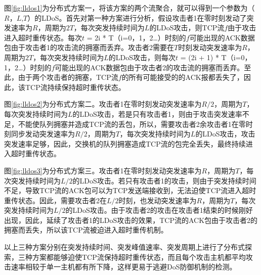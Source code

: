 图\ref{fig:lldos1}为分布式方案一，将该方案的两个流聚合，就可以得到一个参数为（$R$，$L$,$T$）的LDoS。首先对第一种方案进行分析，假设攻击者1在零时刻发动了突发速率为$R$，周期为$2T$，每次突发持续时间为$L$的LDoS攻击，则TCP流$f$由于攻击进入超时重传状态。每次$t$ = 2i * T（i=0，1，2…）时刻的$f$可能出现的ACK数据包由于攻击者1的攻击流的拥塞而丢弃。攻击者2需要在$T$时刻发动突发速率为$R$，周期为$2T$，每次突发持续时间为$L$的LDoS攻击，则每次$t$ = (2i + 1) * T（i=0，1，2…）时刻的$f$可能出现的ACK数据包由于攻击者2的攻击流的拥塞而丢弃。至此，由于两个攻击者的拥塞，TCP流$f$的所有可能接受的的ACK报都丢失了，因此，该TCP流持续保持超时重传状态。


图\ref{fig:lldos2}为分布式方案二。攻击者1在零时刻发动突发速率为$R/2$，周期为$T$，每次突发持续时间为$L$的LDoS攻击，若是只有攻击者1，则由于攻击突发速率不足，不能使队列拥塞并造成TCP流的丢包，所以，需要攻击者2余攻击者1在零时刻同步发动突发速率为$R/2$，周期为$T$，每次突发持续时间为$L$的LDoS攻击，攻击突发速率足够，因此，交换机的队列拥塞造成TCP流的包完全丢失，最终持续进入超时重传状态。


图\ref{fig:lldos3}为分布式方案三。攻击者1在零时刻发动突发速率为$R$，周期为$T$，每次突发持续时间为$L/2$的LDoS攻击。若只有攻击者1的攻击，则由于突发持续时间不足，导致TCP流的ACK包可以为TCP发送端接收到，无法迫使TCP流进入超时重传状态。因此，需要攻击者2在$L/2$时刻，也发动突发速率为$R$，周期为$T$，每次突发持续时间为$L/2$的LDoS攻击。由于攻击者2的攻击在攻击者1结束的时候刚好出现，因此，延续了攻击者1的LDoS攻击的效果，TCP流的ACK包由于攻击者2的拥塞而丢失，所以该TCP流被迫进入超时重传机制。

以上三种方案分别在突发持续时间、突发峰值速率、突发周期上进行了分布式探索，三种方案都能够迫使TCP流保持超时重传状态，而且每个攻击主机都平均攻击速率相较于单一主机都有所下降，这样更易于逃避DoS防御机制的检测。

